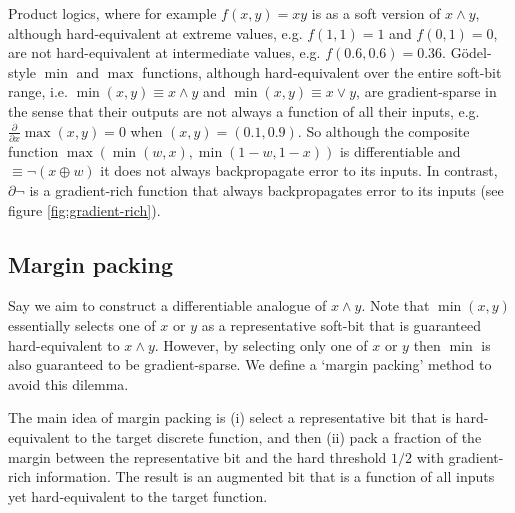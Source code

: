 \documentclass{article} %
\begin{document}
Product logics, where for example $f(x,y) = x y$ is as a soft version of $x \wedge y$, although hard-equivalent at extreme values, e.g. $f(1,1)=1$ and $f(0,1)=0$, are not hard-equivalent at intermediate values, e.g. $f(0.6, 0.6) = 0.36$. G\"{o}del-style $\operatorname{min}$ and $\operatorname{max}$ functions, although hard-equivalent over the entire soft-bit range, i.e. $\operatorname{min}(x,y) \equiv x \wedge y$ and $\operatorname{min}(x,y) \equiv x \vee y$, are gradient-sparse in the sense that their outputs are not always a function of all their inputs, e.g. $\frac{\partial}{\partial x} \operatorname{max}(x,y) = 0$ when $(x,y)=(0.1, 0.9)$. So although the composite function $\operatorname{max}(\operatorname{min}(w, x), \operatorname{min}(1-w, 1-x))$ is differentiable and $\equiv \neg(x \oplus w)$ it does not always backpropagate error to its inputs. In contrast, $\partial \neg$ is a gradient-rich function that always backpropagates error to its inputs (see figure \ref{fig:gradient-rich}). 

\subsection{Margin packing}

Say we aim to construct a differentiable analogue of $x \wedge y$. Note that $\operatorname{min}(x,y)$ essentially selects one of $x$ or $y$ as a representative soft-bit that is guaranteed hard-equivalent to $x \wedge y$. However, by selecting only one of $x$ or $y$ then $\operatorname{min}$ is also guaranteed to be gradient-sparse. We define a `margin packing' method to avoid this dilemma.

The main idea of margin packing is (i) select a representative bit that is hard-equivalent to the target discrete function, and then (ii) pack a fraction of the margin between the representative bit and the hard threshold $1/2$ with gradient-rich information. The result is an augmented bit that is a function of all inputs yet hard-equivalent to the target function.
\end{document}
